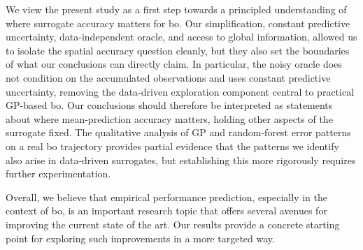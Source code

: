 {We view the present study as a first step towards a principled understanding of where surrogate accuracy matters for \gls{bo}. Our simplification, constant predictive uncertainty, data-independent oracle, and access to global information, allowed us to isolate the spatial accuracy question cleanly, but they also set the boundaries of what our conclusions can directly claim. In particular, the noisy oracle does not condition on the accumulated observations and uses constant predictive uncertainty, removing the data-driven exploration component central to practical GP-based \gls{bo}. Our conclusions should therefore be interpreted as statements about where mean-prediction accuracy matters, holding other aspects of the surrogate fixed. The qualitative analysis of GP and random-forest error patterns on a real \gls{bo} trajectory provides partial evidence that the patterns we identify also arise in data-driven surrogates, but establishing this more rigorously requires further experimentation.


Overall, we believe that empirical performance prediction, especially in the context of \gls{bo}, is an important research topic that offers several avenues for improving the current state of the art. Our results provide a concrete starting point for exploring such improvements in a more targeted way.}
